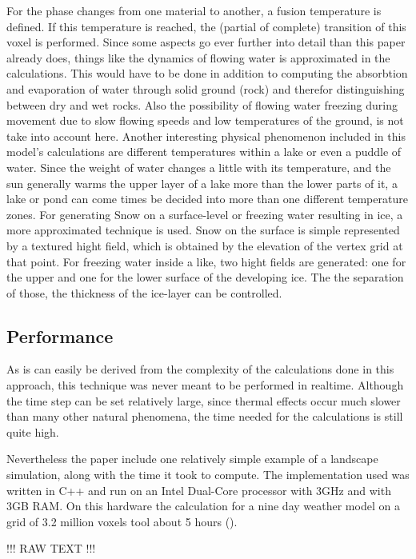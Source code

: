 For the phase changes from one material to another, a fusion temperature is defined. If this temperature is reached, the (partial of complete) transition of this voxel is performed. Since some aspects go ever further into detail than this paper already does, things like the dynamics of flowing water is approximated in the calculations. This would have to be done in addition to computing the absorbtion and evaporation of water through solid ground (rock) and therefor distinguishing between dry and wet rocks. Also the possibility of flowing water freezing during movement due to slow flowing speeds and low temperatures of the ground, is not take into account here. Another interesting physical phenomenon included in this model's calculations are different temperatures within a lake or even a puddle of water. Since the weight of water changes a little with its temperature, and the sun generally warms the upper layer of a lake more than the lower parts of it, a lake or pond can come times be decided into more than one different temperature zones.
For generating Snow on a surface-level or freezing water resulting in ice, a more approximated technique is used. Snow on the surface is simple represented by a textured hight field, which is obtained by the elevation of the vertex grid at that point. For freezing water inside a like, two hight fields are generated: one for the upper and one for the lower surface of the developing ice. The the separation of those, the thickness of the ice-layer can be controlled.

\subsection{Performance}
As is can easily be derived from the complexity of the calculations done in this approach, this technique was never meant to be performed in realtime. Although the time step can be set relatively large, since thermal effects occur much slower than many other natural phenomena, the time needed for the calculations is still quite high.

Nevertheless the paper include one relatively simple example of a landscape simulation, along with the time it took to compute. The implementation used was written in C++ and run on an Intel Dual-Core processor with 3GHz and with 3GB RAM. On this hardware the calculation for a nine day weather model on a grid of 3.2 million voxels tool about 5 hours ().

!!! RAW TEXT !!!